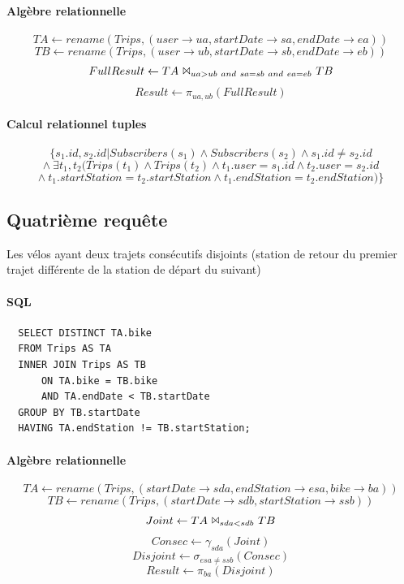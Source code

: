 \documentclass[a4paper]{article}
\begin{document}
    \paragraph{Algèbre relationnelle}
    $$ TA \leftarrow rename(Trips, (user \rightarrow ua, startDate \rightarrow sa, endDate \rightarrow ea)) $$
    $$ TB \leftarrow rename(Trips, (user \rightarrow ub, startDate \rightarrow sb, endDate \rightarrow eb)) $$
    $$ FullResult \leftarrow TA\ \Bowtie_{ua>ub\ and\ sa=sb\ and\ ea=eb}\ TB$$
    $$ Result \leftarrow \pi_{ua, ub} (FullResult) $$

    \paragraph{Calcul relationnel tuples}
    $$ \{ s_1.id, s_2.id | Subscribers(s_1) \land Subscribers(s_2) \land s_1.id \neq s_2.id $$
    $$ \land\ \exists t_1, t_2 (Trips(t_1) \land Trips(t_2) \land t_1.user = s_1.id \land t_2.user = s_2.id $$
    $$ \land\ t_1.startStation = t_2.startStation \land t_1.endStation = t_2.endStation) \} $$



\subsection{Quatrième requête}
    Les vélos ayant deux trajets consécutifs disjoints (station de retour du premier trajet différente de la station de départ du suivant)

    \paragraph{SQL}
  \begin{verbatim}
  SELECT DISTINCT TA.bike
  FROM Trips AS TA
  INNER JOIN Trips AS TB
      ON TA.bike = TB.bike
      AND TA.endDate < TB.startDate
  GROUP BY TB.startDate
  HAVING TA.endStation != TB.startStation;
  \end{verbatim}
  
    \paragraph{Algèbre relationnelle}
    $$ TA \leftarrow rename(Trips, (startDate \rightarrow sda, endStation \rightarrow esa, bike \rightarrow ba)) $$
    $$ TB \leftarrow rename(Trips, (startDate \rightarrow sdb, startStation \rightarrow ssb)) $$
    $$ Joint \leftarrow TA\ \Bowtie_{sda < sdb}\ TB $$
    $$ Consec \leftarrow \gamma_{sda}(Joint) $$
    $$ Disjoint \leftarrow \sigma_{esa \neq ssb}(Consec)$$
    $$ Result \leftarrow \pi_{ba}(Disjoint)$$
    
\end{document}
